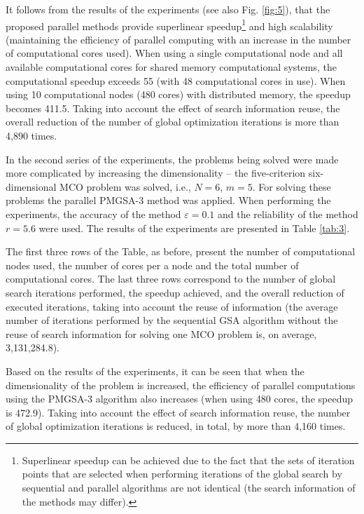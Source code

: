 \documentclass[review]{elsarticle}
\begin{document}
It follows from the results of the experiments (see also Fig. \ref{fig:5}), that the proposed parallel methods provide superlinear speedup\footnote{Superlinear speedup can be achieved due to the fact that the sets of iteration points that are selected when performing iterations of the global search by sequential and parallel algorithms are not identical (the search information of the methods may differ).} and high scalability (maintaining the efficiency of parallel computing with an increase in the number of computational cores used). When using a single computational node and all available computational cores for shared memory computational systems, the computational speedup exceeds 55 (with 48 computational cores in use). When using 10 computational nodes (480 cores) with distributed memory, the speedup becomes 411.5. Taking into account the effect of search information reuse, the overall reduction of the number of global optimization iterations is more than 4,890 times.

In the second series of the experiments, the problems being solved were made more complicated by increasing the dimensionality -- the five-criterion six-dimensional MCO problem was solved, i.e., $N = 6$, $m = 5$. For solving these problems the parallel PMGSA-3 method was applied. When performing the experiments, the accuracy of the method $\varepsilon = 0.1$ and the reliability of the method $r = 5.6$ were used. The results of the experiments are presented in Table \ref{tab:3}.

The first three rows of the Table, as before, present the number of computational nodes used, the number of cores per a node and the total number of computational cores. The last three rows correspond to the number of global search iterations performed, the speedup achieved, and the overall reduction of executed iterations, taking into account the reuse of information (the average number of iterations performed by the sequential GSA algorithm without the reuse of search information for solving one MCO problem is, on average, 3,131,284.8).

Based on the results of the experiments, it can be seen that when the dimensionality of the problem is increased, the efficiency of parallel computations using the PMGSA-3 algorithm also increases (when using 480 cores, the speedup is 472.9). Taking into account the effect of search information reuse, the number of global optimization iterations is reduced, in total, by more than 4,160 times.
\end{document}
